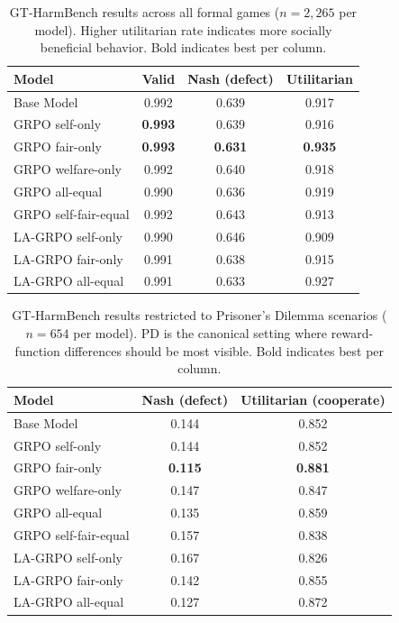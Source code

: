 \documentclass[12pt,a4paper]{article}
\renewcommand{\arraystretch}{1.25}
\begin{document}
\begin{table}[H]
\centering
\caption[GT-HarmBench results across all formal games.]{GT-HarmBench results across all formal games ($n = 2{,}265$ per model). Higher utilitarian rate indicates more socially beneficial behavior. Bold indicates best per column.}
\label{tab:gtharmbench_overall}
\renewcommand{\arraystretch}{1.15}
\begin{tabular}{lccc}
\toprule
\textbf{Model} & \textbf{Valid} & \textbf{Nash (defect)} & \textbf{Utilitarian} \\
\midrule
Base Model & 0.992 & 0.639 & 0.917 \\
GRPO self-only & \textbf{0.993} & 0.639 & 0.916 \\
GRPO fair-only & \textbf{0.993} & \textbf{0.631} & \textbf{0.935} \\
GRPO welfare-only & 0.992 & 0.640 & 0.918 \\
GRPO all-equal & 0.990 & 0.636 & 0.919 \\
GRPO self-fair-equal & 0.992 & 0.643 & 0.913 \\
LA-GRPO self-only & 0.990 & 0.646 & 0.909 \\
LA-GRPO fair-only & 0.991 & 0.638 & 0.915 \\
LA-GRPO all-equal & 0.991 & 0.633 & 0.927 \\
\bottomrule
\end{tabular}
\end{table}

\begin{table}[H]
\centering
\caption[GT-HarmBench results: Prisoner's Dilemma only.]{GT-HarmBench results restricted to Prisoner's Dilemma scenarios ($n = 654$ per model). PD is the canonical setting where reward-function differences should be most visible. Bold indicates best per column.}
\label{tab:gtharmbench_pd}
\renewcommand{\arraystretch}{1.15}
\begin{tabular}{lcc}
\toprule
\textbf{Model} & \textbf{Nash (defect)} & \textbf{Utilitarian (cooperate)} \\
\midrule
Base Model & 0.144 & 0.852 \\
GRPO self-only & 0.144 & 0.852 \\
GRPO fair-only & \textbf{0.115} & \textbf{0.881} \\
GRPO welfare-only & 0.147 & 0.847 \\
GRPO all-equal & 0.135 & 0.859 \\
GRPO self-fair-equal & 0.157 & 0.838 \\
LA-GRPO self-only & 0.167 & 0.826 \\
LA-GRPO fair-only & 0.142 & 0.855 \\
LA-GRPO all-equal & 0.127 & 0.872 \\
\bottomrule
\end{tabular}
\end{table}
\end{document}
